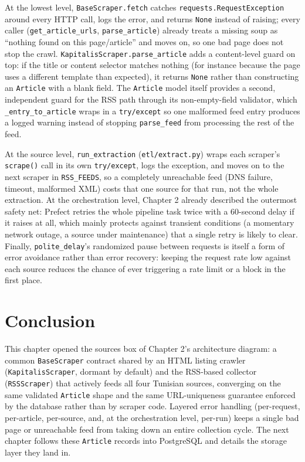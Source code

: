 At the lowest level, \texttt{BaseScraper.fetch} catches \texttt{requests.RequestException} around every HTTP call, logs the error, and returns \texttt{None} instead of raising; every caller (\texttt{get\_article\_urls}, \texttt{parse\_article}) already treats a missing soup as ``nothing found on this page/article'' and moves on, so one bad page does not stop the crawl. \texttt{KapitalisScraper.parse\_article} adds a content-level guard on top: if the title or content selector matches nothing (for instance because the page uses a different template than expected), it returns \texttt{None} rather than constructing an \texttt{Article} with a blank field. The \texttt{Article} model itself provides a second, independent guard for the RSS path through its non-empty-field validator, which \texttt{\_entry\_to\_article} wraps in a \texttt{try/except} so one malformed feed entry produces a logged warning instead of stopping \texttt{parse\_feed} from processing the rest of the feed.

At the source level, \texttt{run\_extraction} (\texttt{etl/extract.py}) wraps each scraper's \texttt{scrape()} call in its own \texttt{try/except}, logs the exception, and moves on to the next scraper in \texttt{RSS\_FEEDS}, so a completely unreachable feed (DNS failure, timeout, malformed XML) costs that one source for that run, not the whole extraction. At the orchestration level, Chapter 2 already described the outermost safety net: Prefect retries the whole pipeline task twice with a 60-second delay if it raises at all, which mainly protects against transient conditions (a momentary network outage, a source under maintenance) that a single retry is likely to clear. Finally, \texttt{polite\_delay}'s randomized pause between requests is itself a form of error avoidance rather than error recovery: keeping the request rate low against each source reduces the chance of ever triggering a rate limit or a block in the first place.

\section{Conclusion}
This chapter opened the sources box of Chapter 2's architecture diagram: a common \texttt{BaseScraper} contract shared by an HTML listing crawler (\texttt{Kapitalis\allowbreak Scraper}, dormant by default) and the RSS-based collector (\texttt{RSSScraper}) that actively feeds all four Tunisian sources, converging on the same validated \texttt{Article} shape and the same URL-uniqueness guarantee enforced by the database rather than by scraper code. Layered error handling (per-request, per-article, per-source, and, at the orchestration level, per-run) keeps a single bad page or unreachable feed from taking down an entire collection cycle. The next chapter follows these \texttt{Article} records into PostgreSQL and details the storage layer they land in.
